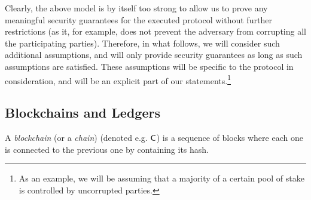 Clearly, the above model is by itself too strong to allow us to prove  any meaningful security
guarantees for the executed protocol without further restrictions (as it, for
example, does not prevent the adversary from corrupting all the participating
parties). Therefore, in what follows, we will consider such additional
assumptions, and will only
provide security guarantees as long as such assumptions are satisfied.
These assumptions will be specific to the protocol in consideration, and will be an
explicit part of our statements.\footnote{As an example, we will be assuming that a
majority of a certain pool of stake is controlled by uncorrupted parties.}





\subsection{Blockchains and Ledgers}
A \emph{blockchain} (or a \emph{chain}) (denoted e.g. $\mathsf{C}$)  is a sequence
of blocks where each one is connected to the previous one by containing its
hash.

